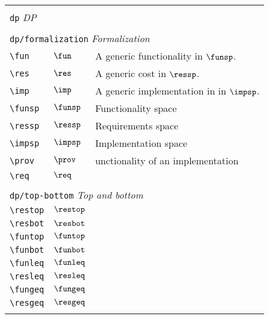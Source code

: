 \begin{longtable}{lll}
  &  & \\ 
 \multicolumn{3}{l}{{\color[rgb]{0.5,0.5,0.5}\texttt{dp}} \emph{DP}}\\ 
 \hline
\hline
 &  & \\ 
 \multicolumn{3}{l}{{\color[rgb]{0.5,0.5,0.5}\texttt{dp/formalization}} \emph{Formalization}}\\ 
 \hline
{\color[rgb]{0.5,0.5,0.5}\texttt{\textbackslash fun}} & $\fun$ &  A generic functionality in $\funsp$.\\ 
 {\color[rgb]{0.5,0.5,0.5}\texttt{\textbackslash res}} & $\res$ &  A generic cost in $\ressp$.\\ 
 {\color[rgb]{0.5,0.5,0.5}\texttt{\textbackslash imp}} & $\imp$ &  A generic implementation in in $\impsp$.\\ 
 {\color[rgb]{0.5,0.5,0.5}\texttt{\textbackslash funsp}} & $\funsp$ &  Functionality space\\ 
 {\color[rgb]{0.5,0.5,0.5}\texttt{\textbackslash ressp}} & $\ressp$ &  Requirements space\\ 
 {\color[rgb]{0.5,0.5,0.5}\texttt{\textbackslash impsp}} & $\impsp$ &  Implementation space\\ 
 {\color[rgb]{0.5,0.5,0.5}\texttt{\textbackslash prov}} & $\prov$ &  unctionality of an implementation\\ 
 {\color[rgb]{0.5,0.5,0.5}\texttt{\textbackslash req}} & $\req$ & \\ 
  &  & \\ 
 \multicolumn{3}{l}{{\color[rgb]{0.5,0.5,0.5}\texttt{dp/top-bottom}} \emph{Top and bottom}}\\ 
 \hline
{\color[rgb]{0.5,0.5,0.5}\texttt{\textbackslash restop}} & $\restop$ & \\ 
 {\color[rgb]{0.5,0.5,0.5}\texttt{\textbackslash resbot}} & $\resbot$ & \\ 
 {\color[rgb]{0.5,0.5,0.5}\texttt{\textbackslash funtop}} & $\funtop$ & \\ 
 {\color[rgb]{0.5,0.5,0.5}\texttt{\textbackslash funbot}} & $\funbot$ & \\ 
 {\color[rgb]{0.5,0.5,0.5}\texttt{\textbackslash funleq}} & $\funleq$ & \\ 
 {\color[rgb]{0.5,0.5,0.5}\texttt{\textbackslash resleq}} & $\resleq$ & \\ 
 {\color[rgb]{0.5,0.5,0.5}\texttt{\textbackslash fungeq}} & $\fungeq$ & \\ 
 {\color[rgb]{0.5,0.5,0.5}\texttt{\textbackslash resgeq}} & $\resgeq$ & \\ 
  &  & \\ 

\end{longtable}
